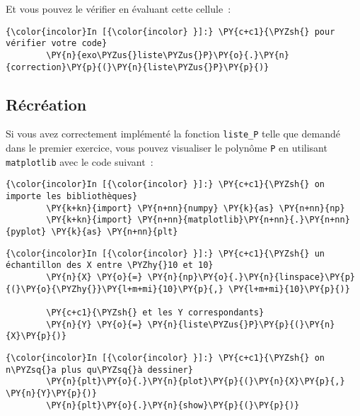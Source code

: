     Et vous pouvez le vérifier en évaluant cette cellule~:

    \begin{Verbatim}[commandchars=\\\{\}]
{\color{incolor}In [{\color{incolor} }]:} \PY{c+c1}{\PYZsh{} pour vérifier votre code}
        \PY{n}{exo\PYZus{}liste\PYZus{}P}\PY{o}{.}\PY{n}{correction}\PY{p}{(}\PY{n}{liste\PYZus{}P}\PY{p}{)}
\end{Verbatim}

    \hypertarget{ruxe9cruxe9ation}{%
\subsection{Récréation}\label{ruxe9cruxe9ation}}

    Si vous avez correctement implémenté la fonction \texttt{liste\_P} telle
que demandé dans le premier exercice, vous pouvez visualiser le polynôme
\texttt{P} en utilisant \texttt{matplotlib} avec le code suivant~:

    \begin{Verbatim}[commandchars=\\\{\}]
{\color{incolor}In [{\color{incolor} }]:} \PY{c+c1}{\PYZsh{} on importe les bibliothèques}
        \PY{k+kn}{import} \PY{n+nn}{numpy} \PY{k}{as} \PY{n+nn}{np}
        \PY{k+kn}{import} \PY{n+nn}{matplotlib}\PY{n+nn}{.}\PY{n+nn}{pyplot} \PY{k}{as} \PY{n+nn}{plt}
\end{Verbatim}


    \begin{Verbatim}[commandchars=\\\{\}]
{\color{incolor}In [{\color{incolor} }]:} \PY{c+c1}{\PYZsh{} un échantillon des X entre \PYZhy{}10 et 10}
        \PY{n}{X} \PY{o}{=} \PY{n}{np}\PY{o}{.}\PY{n}{linspace}\PY{p}{(}\PY{o}{\PYZhy{}}\PY{l+m+mi}{10}\PY{p}{,} \PY{l+m+mi}{10}\PY{p}{)}
        
        \PY{c+c1}{\PYZsh{} et les Y correspondants}
        \PY{n}{Y} \PY{o}{=} \PY{n}{liste\PYZus{}P}\PY{p}{(}\PY{n}{X}\PY{p}{)}
\end{Verbatim}


    \begin{Verbatim}[commandchars=\\\{\}]
{\color{incolor}In [{\color{incolor} }]:} \PY{c+c1}{\PYZsh{} on n\PYZsq{}a plus qu\PYZsq{}à dessiner}
        \PY{n}{plt}\PY{o}{.}\PY{n}{plot}\PY{p}{(}\PY{n}{X}\PY{p}{,} \PY{n}{Y}\PY{p}{)}
        \PY{n}{plt}\PY{o}{.}\PY{n}{show}\PY{p}{(}\PY{p}{)}
\end{Verbatim}